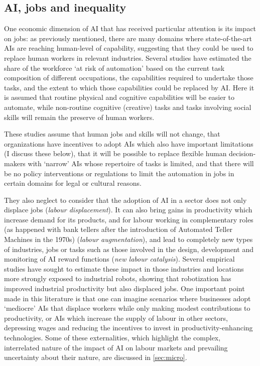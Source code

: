 \documentclass[11pt]{article}
\begin{document}
\subsection{AI, jobs and inequality}
\label{subsec:jobs}
One economic dimension of AI that has received particular attention is its impact on jobs: as previously mentioned, there are many domains where state-of-the-art AIs are reaching human-level of capability,  suggesting that they could be used to replace human workers in relevant industries. Several studies have estimated the share of the workforce `at risk of automation' based on the current task composition of different occupations, the capabilities required to undertake those tasks, and the extent to which those capabilities could be replaced by AI. Here it is assumed that routine physical and cognitive capabilities will be easier to automate, while non-routine cognitive (creative) tasks and tasks involving social skills will remain the preserve of human workers. 

These studies assume that human jobs and skills will not change, that organizations have incentives to adopt AIs which also have important limitations (I discuss these below), that it will be possible to replace flexible human decision-makers with `narrow' AIs whose repertoire of tasks is limited, and that there will be no policy interventions or regulations to limit the automation in jobs in certain domains for legal or cultural reasons. 

They also neglect to consider that the adoption of AI in a sector does not only displace jobs (\textit{labour displacement}). It can also bring gains in productivity which increase demand for its products, and for labour working in complementary roles (as happened with bank tellers after the introduction of Automated Teller Machines in the 1970s) (\textit{labour augmentation}), and lead to completely new types of industries, jobs or tasks such as those involved in the design, development and monitoring of AI reward functions (\textit{new labour catalysis}). Several empirical studies have sought to estimate these impact in those industries and locations more strongly exposed to industrial robots, showing that robotization has improved industrial productivity but also displaced jobs. One important point made in this literature is that one can imagine scenarios where businesses adopt `mediocre' AIs that displace workers while only making modest contributions to productivity, or AIs which increase the supply of labour in other sectors, depressing wages and reducing the incentives to invest in productivity-enhancing technologies. Some of these externalities, which highlight the complex, interrelated nature of the impact of AI on labour markets and prevailing uncertainty about their nature, are discussed in \ref{sec:micro}.
\end{document}
